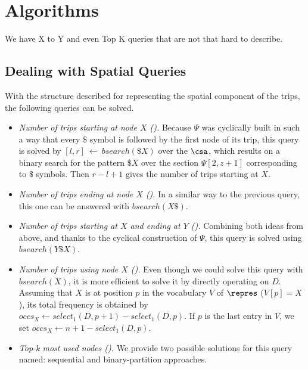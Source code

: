 \section{Algorithms}
We have X to Y and even Top K queries that are not that hard to describe.

\subsection{Dealing with Spatial Queries}
\label{sec:sq}

With the structure described for representing the spatial component of the trips,
the following queries can be solved.

\begin{itemize}[leftmargin=3mm]
\setlength{\itemindent}{0mm}
\item {\em Number of trips starting at node $X$ (\Sswx).}
Because $\Psi$ was cyclically built in such a way that every $\$$ symbol is followed by the first node 
of its trip, this query is solved by $[l,r]~\leftarrow~bsearch(\$X)$ over the $\csa$, 
which results on a binary search for the pattern $\$X$ over the section $\Psi[2,z+1]$ corresponding to $\$$ symbols. 
Then $r-l+1$ gives the number of trips starting at $X$.

\item {\em Number of trips ending at node $X$ (\Sewx).} In a similar way to the previous query, 
this one can be answered with $bsearch(X\$)$.

\item {\em Number of trips starting at $X$ and ending at $Y$ (\Sfxty).}
Combining both ideas from above, and thanks to the cyclical construction of $\Psi$, this query is solved 
using $bsearch(Y\$X)$.

\item {\em Number of trips using node $X$ (\Sux).}
Even though we could solve this query with $bsearch(X)$, it is more efficient to solve it by directly operating on $D$. 
 Assuming that $X$ is
at position $p$ in the vocabulary $V$ of  $\repres$ ($V[p]=X$), its total frequency is obtained by
$occs_X \leftarrow select_1(D,p+1) - select_1(D,p)$. %
If $p$ is the last entry in $V$, we set $occs_X \leftarrow n+1-select_1(D,p)$.

\setlength{\itemindent}{0mm}
\item {\em Top-k most used nodes (\Stk).}
We provide two possible solutions for this query named: %
sequential and binary-partition approaches. 


\end{itemize}
